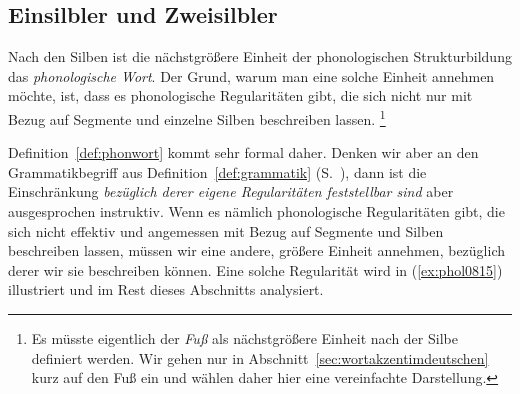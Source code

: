 \subsection{Einsilbler und Zweisilbler}

\label{sec:einsilblerzweisilbler}


Nach den Silben ist die nächstgrößere Einheit der phonologischen Strukturbildung das \textit{phonologische Wort}.
Der Grund, warum man eine solche Einheit annehmen möchte, ist, dass es phonologische Regularitäten gibt, die sich nicht nur mit Bezug auf Segmente und einzelne Silben beschreiben lassen.%
\footnote{Es müsste eigentlich der \textit{Fuß} als nächstgrößere Einheit nach der Silbe definiert werden.
Wir gehen nur in Abschnitt~\ref{sec:wortakzentimdeutschen} kurz auf den Fuß ein und wählen daher hier eine vereinfachte Darstellung.}


Definition~\ref{def:phonwort} kommt sehr formal daher.
Denken wir aber an den Grammatikbegriff aus Definition~\ref{def:grammatik} (S.~\pageref{def:grammatik}), dann ist die Einschränkung \textit{bezüglich derer eigene Regularitäten feststellbar sind} aber ausgesprochen instruktiv.
Wenn es nämlich phonologische Regularitäten gibt, die sich nicht effektiv und angemessen mit Bezug auf Segmente und Silben beschreiben lassen, müssen wir eine andere, größere Einheit annehmen, bezüglich derer wir sie beschreiben können.
Eine solche Regularität wird in (\ref{ex:phol0815}) illustriert und im Rest dieses Abschnitts analysiert.

\begin{exe}
  \ex\label{ex:phol0815}
  \begin{xlist}
  	\ex{\label{ex:phol0815b} *\textipa{[knI]}}
  	\ex{\label{ex:phol0815f} *\textipa{[vi:Nk]}}
  	\ex{\label{ex:phol0815k} *\textipa{[v\t{i5}k.t@]}}
  \end{xlist}
\end{exe}

